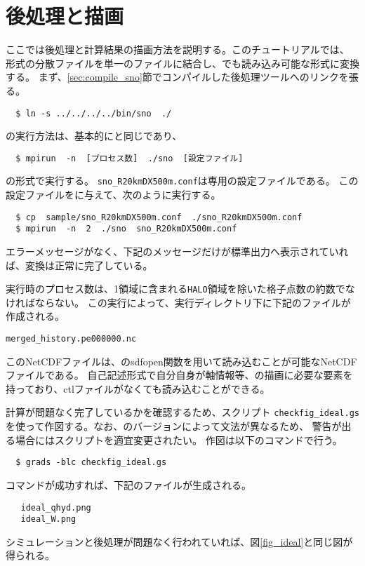\section{後処理と描画} \label{sec:ideal_exp_sno}
ここでは後処理と計算結果の描画方法を説明する。このチュートリアルでは、
{\netcdf}形式の分散ファイルを単一のファイルに結合し、\grads でも読み込み可能な{\netcdf}形式に変換する。
まず、\ref{sec:compile_sno}節でコンパイルした後処理ツール\sno へのリンクを張る。
\begin{verbatim}
  $ ln -s ../../../../bin/sno  ./
\end{verbatim}

\sno の実行方法は、基本的に{\scalerm}と同じであり、
\begin{verbatim}
  $ mpirun  -n  [プロセス数]  ./sno  [設定ファイル]
\end{verbatim}
の形式で実行する。
\verb|sno_R20kmDX500m.conf|は\sno 専用の設定ファイルである。
この設定ファイルを\sno に与えて、次のように実行する。
\begin{verbatim}
  $ cp  sample/sno_R20kmDX500m.conf  ./sno_R20kmDX500m.conf
  $ mpirun  -n  2  ./sno  sno_R20kmDX500m.conf
\end{verbatim}
エラーメッセージがなく、下記のメッセージだけが標準出力へ表示されていれば、変換は正常に完了している。

\sno 実行時のプロセス数は、1領域に含まれる\texttt{HALO}領域を除いた格子点数の約数でなければならない。
この実行によって、実行ディレクトリ下に下記のファイルが作成される。
\begin{alltt}
  merged_history.pe000000.nc
\end{alltt}
このNetCDFファイルは、\grads のsdfopen関数を用いて読み込むことが可能なNetCDFファイルである。
自己記述形式で自分自身が軸情報等、\grads の描画に必要な要素を持っており、ctlファイルがなくても読み込むことができる。

計算が問題なく完了しているかを確認するため、\grads スクリプト \verb|checkfig_ideal.gs|
を使って作図する。なお、\grads のバージョンによって文法が異なるため、
警告が出る場合には\grads スクリプトを適宜変更されたい。
作図は以下のコマンドで行う。
\begin{verbatim}
  $ grads -blc checkfig_ideal.gs
\end{verbatim}
コマンドが成功すれば、下記のファイルが生成される。
\begin{verbatim}
   ideal_qhyd.png
   ideal_W.png
\end{verbatim}
シミュレーションと後処理が問題なく行われていれば、図\ref{fig_ideal}と同じ図が得られる。

